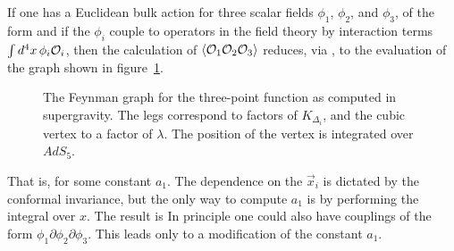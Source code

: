 If one has a Euclidean bulk action for three scalar fields $\phi_1$,
$\phi_2$, and $\phi_3$, of the form
 and if the $\phi_i$ couple to operators in the field theory by interaction
terms $\int d^4 x \, \phi_i {\cal O}_i$, then the calculation of $\langle
{\cal O}_1 {\cal O}_2 {\cal O}_3 \rangle$ reduces, via \WvsS, to the
evaluation of the graph shown in figure~\ref{figAssg}.  
  \begin{figure}
      \vskip0cm
   \centerline{}
   \vskip0cm
 \caption{The Feynman graph for the three-point function as computed in
supergravity.  The legs correspond to 
factors of $K_{\Delta_i}$, and the cubic vertex to
a factor of $\lambda$.  The position of the vertex is integrated
over $AdS_5$.}\label{figAssg}
  \end{figure}
 That is,
 for some constant $a_1$.  The dependence on the $\vec{x}_i$ is dictated by
the conformal invariance, but the only way to compute $a_1$ is by
performing the integral over $x$.  The result \cite{Freedman:1998tz} is
 In principle one could also have couplings of the form $\phi_1
\partial\phi_2 \partial\phi_3$.  This leads only to a modification of the
constant $a_1$.

